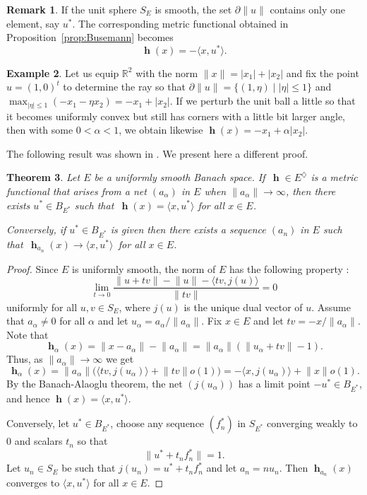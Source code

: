 \documentclass[a4paper,12pt]{article}
\newtheorem{theorem}{Theorem}[section]
\theoremstyle{definition}
\newtheorem{example}[theorem]{Example}
\newtheorem{remark}[theorem]{Remark}
\numberwithin{equation}{section}
\newcommand{\abs}[1]{\lvert#1\rvert} %
\newcommand{\norm}[1]{\lVert#1\rVert} %
\newcommand{\dpair}[2]{\langle#1, #2\rangle} %
\numberwithin{equation}{section}
\DeclareMathOperator{\h}{\mathbf{h}} %
\begin{document}
\begin{remark}
If the unit sphere $S_E$ is smooth, the set 
$\partial \norm{u}$ contains only one element, 
say $u^*$. The corresponding metric functional 
obtained in Proposition~\ref{prop:Busemann} 
becomes 
$$
\h(x) = - \dpair{x}{u^*}.
$$
\end{remark}

\begin{example} \label{1normi} 
Let us equip $\mathbb R^2$ with the norm 
$\norm{x} = \abs{x_1} + \abs{x_2}$ and fix 
the point $u=(1, 0 )^t$ to determine the ray 
so that 
$\partial\norm{u} = \{(1,\eta) \mid  |\eta | \le 1 \}$ 
and 
$\max_{|\eta |\le 1}(-x_1- \eta x_2) = -x_1 +  |x_2|.$ 
If we perturb the unit ball a little so that 
it becomes uniformly convex but still has 
corners with a little bit larger angle, then 
with some $0<\alpha <1$, we obtain likewise 
$\h(x)= - x_1 +\alpha |x_2|$.   
\end{example} 

The following result was shown in 
\cite[Section~5]{Gutierrez2019-2}. We present 
here a different proof. 

\begin{theorem}  
Let $E$ be a uniformly smooth Banach space. 
If $\,\h\in E^\diamondsuit$ is a metric 
functional that arises from a net 
$(a_\alpha)$ in $E$ when 
$\norm{a_\alpha} \to \infty$,
then there exists $u^* \in B_{E^*}$ such that 
$\,\h(x)= \dpair{x}{u^*}$ for all $x\in E$.

Conversely, if $u^* \in B_{E^*}$ is given 
then there exists a sequence $(a_n)$ in $E$ 
such that $\,\h_{a_n}(x) \to \dpair{x}{u^*}\,$ 
for all $x \in E$.  
\end{theorem}  

\begin{proof}  
Since $E$ is uniformly smooth, the norm of $E$ has the 
    following property \cite[p.~36]{Diestel1975}: 
    $$
        \lim_{t\to 0}\frac{\norm{u+tv} -\norm{u} 
            - \dpair{tv}{j(u)}}{\norm{tv}} = 0
    $$
    uniformly for all $u,v\in S_E$, where $j(u)$ is the unique 
    dual vector of $u$. Assume that $a_\alpha\neq 0$ for all 
    $\alpha$ and let $u_\alpha = a_\alpha / \norm{a_\alpha}$.
    Fix $x\in E$ and let $t v = -x/\norm{a_\alpha}$. 
    Note that
    $$
        \h_\alpha(x) =  \norm{x-a_\alpha} - \norm{a_\alpha} 
                    = \norm{a_\alpha}(\norm{u_\alpha + tv}-1).
    $$
    Thus, as $\norm{a_\alpha}\to\infty$ we get
    $$
        \h_\alpha(x) = \norm{a_\alpha}\big(\dpair{tv}{j(u_\alpha)} 
                        + \norm{tv}o(1)\big)  
                = - \dpair{x}{j(u_\alpha)} + \norm{x}o(1).
    $$
    By the Banach-Alaoglu theorem, the net $(j(u_\alpha))$ has a limit point
    $-u^*\in B_{E^*}$, and hence $\h(x)= \dpair{x}{u^*}$.
    
    Conversely, let $u^* \in B_{E^*}$, choose any sequence $(f_n^*)$ 
    in $S_{E^*}$ converging weakly to $0$ and scalars $t_n$ so that 
    $$ 
        \norm{u^* + t_n f_n^*} = 1.
    $$   
    Let $u_n\in S_E$ be such that $j(u_n)= u^* + t_nf_n^*$ and 
    let $a_n = nu_n$. Then $\h_{a_n}(x)$ converges to 
    $\dpair{x}{u^*}$ for all $x\in E$. 
\end{proof}
\end{document}
